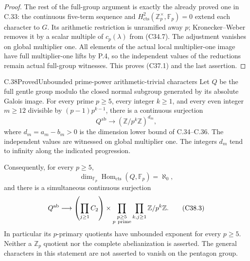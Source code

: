 \begin{proof}
The rest of the full-group argument is exactly the
already proved one in C.33: the continuous five-term
sequence and
$H^2_{\mathrm{cts}}(\mathbb Z_p^\times,\mathbb F_p)=0$
extend each character to $G$.
Its arithmetic restriction is unramified away $p$;
Kronecker--Weber removes it by a scalar multiple of
$c_p(\lambda)$ from (C34.7).
The adjustment vanishes on global multiplier one.
All elements of the actual local multiplier-one
image have full multiplier-one lifts by P.4, so
the independent values of the reductions remain
actual full-group witnesses.
This proves (C37.1) and the last assertion.
\end{proof}


\begin{statement}{C.38}{Proved}{Unbounded prime-power arithmetic-trivial characters}
Let \(Q\) be the full gentle group modulo the closed normal
subgroup generated by its absolute Galois image.
For every prime \(p\geq5\), every integer \(k\geq1\), and every
even integer \(m\geq12\) divisible by \((p-1)p^{k-1}\), there is
a continuous surjection
\[
                  Q^{\mathrm{ab}}\longrightarrow
                       (\mathbb Z/p^k\mathbb Z)^{d_m},
                                                               \tag{C38.1}
\]
where \(d_m=a_m-b_m>0\) is the dimension lower bound of
C.34--C.36.  The independent values are witnessed on global
multiplier one.  The integers \(d_m\) tend to infinity along
the indicated progression.

Consequently, for every \(p\geq5\),
\[
 \dim_{\mathbb F_p}\operatorname{Hom}_{\mathrm{cts}}
                         (Q,\mathbb F_p)=\aleph_0,
                                                               \tag{C38.2}
\]
and there is a simultaneous continuous surjection
\[
 Q^{\mathrm{ab}}\longrightarrow
       \left(\prod_{j\geq1}C_2\right)
       \times
       \prod_{\substack{p\geq5\\p\ {\rm prime}}}
             \prod_{k,j\geq1}\mathbb Z/p^k\mathbb Z .
                                                               \tag{C38.3}
\]
In particular its \(p\)-primary quotients have unbounded
exponent for every \(p\geq5\).  Neither a
\(\mathbb Z_p\) quotient nor the complete abelianization is
asserted.  The general characters in this statement are not
asserted to vanish on the pentagon group.
\end{statement}
